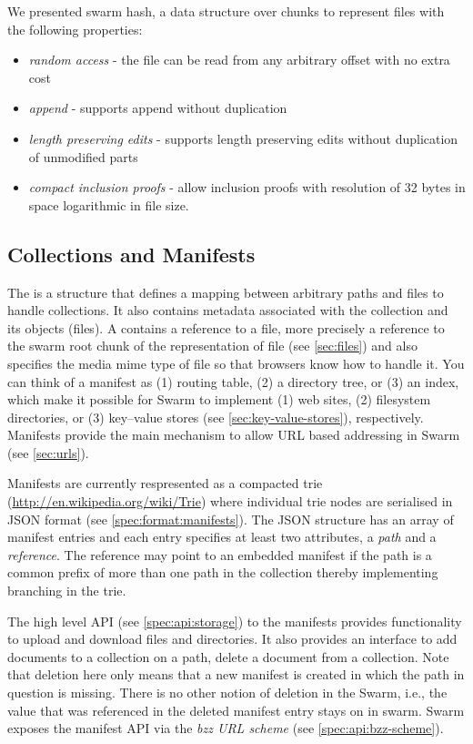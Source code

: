 We presented swarm hash, a data structure over chunks to represent files with the following properties:

\begin{itemize}
    \item \emph{random access} - the file can be read from any arbitrary offset with no extra cost
    \item \emph{append} - supports append without duplication 
    \item \emph{length preserving edits} - supports length preserving edits without duplication of unmodified parts
    \item \emph{compact inclusion proofs} - allow inclusion proofs with resolution of 32 bytes in space logarithmic in file size.
\end{itemize}



\subsection{Collections and Manifests}\label{sec:collections}

The  is a structure that defines a mapping between arbitrary paths and files to handle collections. It also contains metadata associated with the collection and its objects (files). A  contains a reference to a file, more precisely a reference to the swarm root chunk of the representation of file (see \ref{sec:files}) and also specifies the media mime type of file so that browsers know how to handle it. You can think of a manifest as (1) routing table, (2) a directory tree, or  (3) an index, which make it possible for Swarm to implement (1) web sites, (2) filesystem directories, or (3) key--value stores (see \ref{sec:key-value-stores}), respectively. Manifests provide the main mechanism to allow URL based addressing in Swarm (see \ref{sec:urls}). 

Manifests are currently respresented as a compacted trie (\url{http://en.wikipedia.org/wiki/Trie}) where individual trie nodes are  serialised in JSON format (see \ref{spec:format:manifests}). The JSON structure has an array of manifest entries and each entry specifies at least two attributes, a \emph{path} and a \emph{reference}. The reference may point to an embedded manifest if the path is a common prefix of more than one path in the collection thereby implementing branching in the trie. 

The high level API (see \ref{spec:api:storage}) to the manifests provides functionality to upload and download  files and directories. It also provides an interface to add documents to a collection on a path, delete a document from a collection. Note that deletion here only means that a new manifest is created in which the path in question is missing. There is no other notion of deletion in the Swarm, i.e., the value that was referenced in the deleted manifest entry stays on in swarm. Swarm exposes the manifest API via the \emph{bzz URL scheme} (see \ref{spec:api:bzz-scheme}).

